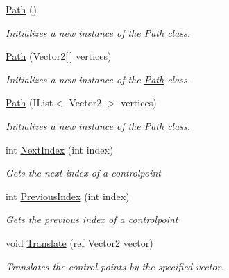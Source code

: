 \begin{DoxyCompactItemize}
\item 
\hyperlink{class_farseer_physics_1_1_common_1_1_path_af7c5be13bc8942c419991c59dfe0fdd3}{Path} ()
\begin{DoxyCompactList}\small\item\em Initializes a new instance of the \hyperlink{class_farseer_physics_1_1_common_1_1_path}{Path} class. \end{DoxyCompactList}\item 
\hyperlink{class_farseer_physics_1_1_common_1_1_path_a76bb1f5e01b0993bec52e38d6dd7777a}{Path} (Vector2\mbox{[}$\,$\mbox{]} vertices)
\begin{DoxyCompactList}\small\item\em Initializes a new instance of the \hyperlink{class_farseer_physics_1_1_common_1_1_path}{Path} class. \end{DoxyCompactList}\item 
\hyperlink{class_farseer_physics_1_1_common_1_1_path_a13023943276476d6846c8d18ef064e9a}{Path} (I\+List$<$ Vector2 $>$ vertices)
\begin{DoxyCompactList}\small\item\em Initializes a new instance of the \hyperlink{class_farseer_physics_1_1_common_1_1_path}{Path} class. \end{DoxyCompactList}\item 
int \hyperlink{class_farseer_physics_1_1_common_1_1_path_abf865d962e6fe3758bce609b9b114c7e}{Next\+Index} (int index)
\begin{DoxyCompactList}\small\item\em Gets the next index of a controlpoint \end{DoxyCompactList}\item 
int \hyperlink{class_farseer_physics_1_1_common_1_1_path_a9e2fa9abb574b690f43d1f677165c2d4}{Previous\+Index} (int index)
\begin{DoxyCompactList}\small\item\em Gets the previous index of a controlpoint \end{DoxyCompactList}\item 
void \hyperlink{class_farseer_physics_1_1_common_1_1_path_a684ac09afe5bfff7aa264cb3a11b5b10}{Translate} (ref Vector2 vector)
\begin{DoxyCompactList}\small\item\em Translates the control points by the specified vector. \end{DoxyCompactList}\item 

\end{DoxyCompactItemize}
